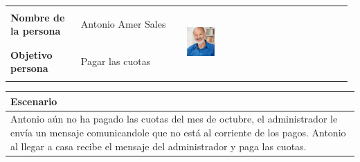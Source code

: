 \documentclass[11pt]{article}
\begin{document}
\begin{table}[H]
  \centering
  \begin{tabular}{p{0.2\linewidth}|p{0.3\linewidth}p{0.475\linewidth}}
    \toprule
    \textbf{Nombre de la persona} & Antonio Amer Sales &\multirow{2}{*}{\begin{minipage}{1.\textwidth}\includegraphics[width=0.18\textwidth, height=26mm]{Antonio}\end{minipage}}\\
    \textbf{Objetivo persona} & Pagar las cuotas & \\
    \bottomrule
  \end{tabular}

\begin{tabular}{p{1.028\linewidth}}
  \textbf{Escenario}\\
  \midrule
  Antonio aún no ha pagado las cuotas del mes de octubre, el administrador le envía un mensaje comunicandole que no está al corriente de los pagos. Antonio al llegar a casa recibe el mensaje del administrador y paga las cuotas.
\end{tabular}

\end{table}
\end{document}
